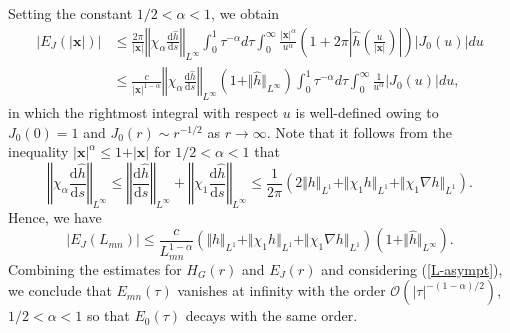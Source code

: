 \documentclass{article}
\theoremstyle{definition}
\begin{document}
Setting the constant $1 /2 < \alpha < 1$, we obtain
\begin{align*}
\left\vert E_J(\vert{\bm x}\vert) \right\vert &\leq  \frac{2 \pi}{\vert{\bm x}\vert} \left\Vert \chi_{\alpha} \frac{\mbox{d}\widehat{h}}{\mbox{d}s} \right\Vert_{L^\infty} \int_0^1 \tau^{-\alpha}d\tau \int_0^\infty \frac{\vert{\bm x}\vert^\alpha}{u^\alpha}   \left( 1 + 2\pi\left\vert \widehat{h}\left( \frac{u}{\vert{\bm x}\vert} \right) \right\vert \right) \left\vert J_0 \left( u \right) \right\vert du \\
&\leq  \frac{c}{\vert{\bm x}\vert^{1 - \alpha}} \left\Vert \chi_{\alpha} \frac{\mbox{d}\widehat{h}}{\mbox{d}s} \right\Vert_{L^\infty} \left( 1 + \Vert \widehat{h} \Vert_{L^\infty} \right) \int_0^1 \tau^{-\alpha}d\tau \int_0^\infty \frac{1}{u^\alpha} \left\vert J_0 \left( u \right) \right\vert du,
\end{align*}
in which the rightmost integral with respect $u$ is well-defined owing to $J_0(0)=1$ and $J_0(r) \sim r^{-1/2}$ as $r \rightarrow \infty$. Note that it follows from the inequality $\vert{\bm x}\vert^\alpha \leq 1 + \vert{\bm x}\vert $ for $1/2 < \alpha < 1$ that
\begin{equation}
\left\Vert \chi_{\alpha} \frac{\mbox{d}\widehat{h}}{\mbox{d}s} \right\Vert_{L^\infty} \leq \left\Vert \frac{\mbox{d}\widehat{h}}{\mbox{d}s} \right\Vert_{L^\infty} + \left\Vert \chi_1 \frac{\mbox{d}\widehat{h}}{\mbox{d}s} \right\Vert_{L^\infty} \leq \frac{1}{2 \pi} \left( 2 \Vert h \Vert_{L^1} + \Vert \chi_1 h \Vert_{L^1} + \Vert \chi_1 \nabla h \Vert_{L^1} \right).
\end{equation}
Hence, we have
\begin{equation*}
\left\vert E_J(L_{mn}) \right\vert \leq  \frac{c}{L_{mn}^{1 - \alpha}} \left( \Vert h \Vert_{L^1} + \Vert \chi_1 h \Vert_{L^1} + \Vert \chi_1 \nabla h \Vert_{L^1} \right) \left( 1 + \Vert \widehat{h} \Vert_{L^\infty} \right).
\end{equation*}
Combining the estimates for $H_G(r)$ and $E_J(r)$ and considering (\ref{L-asympt}), we conclude that $E_{mn}(\tau)$ vanishes at infinity with the order $\mathcal{O}(\vert\tau\vert^{ - (1 -\alpha)/2})$, $1 /2 < \alpha < 1$ so that $E_0(\tau)$ decays with the same order.
\end{document}
